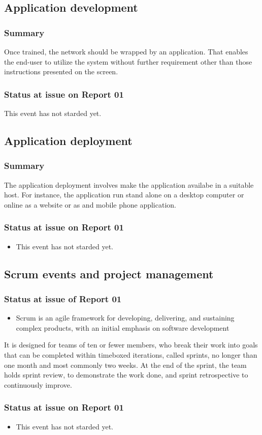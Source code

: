 \documentclass{article}
\begin{document}
\subsection{Application development}
\label{sec:org9aee8b0}
\subsubsection{Summary}
\label{sec:org1953a2e}
Once trained, the network should be wrapped by an application.
That enables the end-user to utilize the system without further requirement other than those instructions presented on the screen.
\subsubsection{Status at issue on Report 01}
\label{sec:org613c652}
This event has not starded yet.

\subsection{Application deployment}
\label{sec:org6e41cbd}
\subsubsection{Summary}
\label{sec:orgd131d0c}
The application deployment involves make the application availabe in a suitable host.
For instance, the application run stand alone on a desktop computer or online as a website or as and mobile phone application.
\subsubsection{Status at issue on Report 01}
\label{sec:org123f917}
\begin{itemize}
\item This event has not starded yet.
\end{itemize}

\subsection{Scrum events and project management}
\label{sec:orge2461f4}
\subsubsection{Status at issue of Report 01}
\label{sec:org6e1d665}
\begin{itemize}
\item Scrum is an agile framework for developing, delivering, and sustaining complex products, with an initial emphasis on software development
\end{itemize}
It is designed for teams of ten or fewer members, who break their work into goals that can be completed within timeboxed iterations, called sprints, no longer than one month and most commonly two weeks.
At the end of the sprint, the team holds sprint review, to demonstrate the work done, and sprint retrospective to continuously improve.
\subsubsection{Status at issue on Report 01}
\label{sec:org7c02d83}
\begin{itemize}
\item This event has not starded yet.
\end{itemize}
\end{document}
